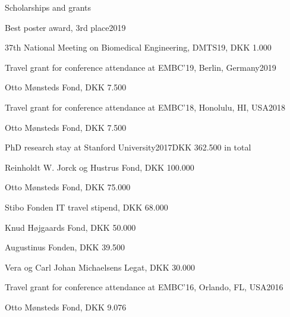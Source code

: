 \documentclass{resume} %
\begin{document}




\begin{rSection}{Scholarships and grants}

    \begin{rSubsection}{Best poster award, 3rd place}{2019}{}{}
    \item 37th National Meeting on Biomedical Engineering, DMTS19, DKK 1.000
    \end{rSubsection}
    
    \begin{rSubsection}{Travel grant for conference attendance at EMBC'19, Berlin, Germany}{2019}{}{}
    \item Otto Mønsteds Fond, DKK 7.500
    \end{rSubsection}
    
    \begin{rSubsection}{Travel grant for conference attendance at EMBC'18, Honolulu, HI, USA}{2018}{}{}
    \item Otto Mønsteds Fond, DKK 7.500
    \end{rSubsection}
    
    \begin{rSubsection}{PhD research stay at Stanford University}{2017}{DKK 362.500 in total}{}
    \item Reinholdt W. Jorck og Hustrus Fond, DKK 100.000
    \item Otto Mønsteds Fond, DKK 75.000
    \item Stibo Fonden IT travel stipend, DKK 68.000
    \item Knud Højgaards Fond, DKK 50.000
    \item Augustinus Fonden, DKK 39.500
    \item Vera og Carl Johan Michaelsens Legat, DKK 30.000
    \end{rSubsection}
    
    \begin{rSubsection}{Travel grant for conference attendance at EMBC'16, Orlando, FL, USA}{2016}{}{}
    \item Otto Mønsteds Fond, DKK 9.076
    \end{rSubsection}
    

\end{rSection}
\end{document}
